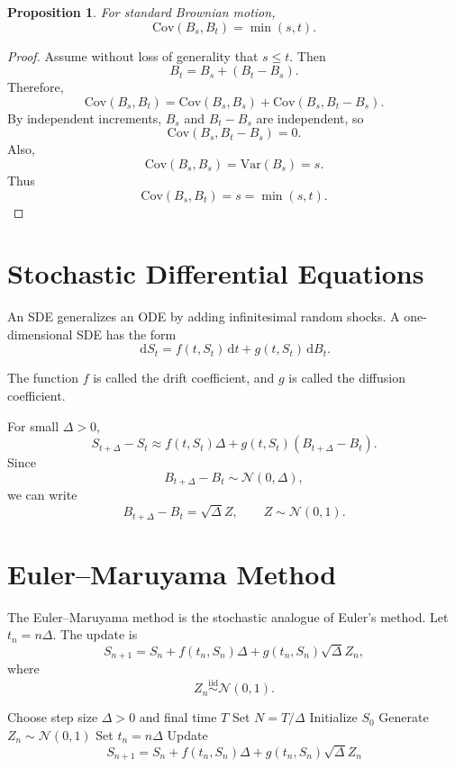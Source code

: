 \documentclass[12pt,oneside]{book}
\numberwithin{equation}{section}
\theoremstyle{definition}
\theoremstyle{plain}
\newtheorem{proposition}{Proposition}[section]
\theoremstyle{remark}
\newcommand{\Var}{\mathrm{Var}}
\newcommand{\Cov}{\mathrm{Cov}}
\newcommand{\iid}{\overset{\text{iid}}{\sim}}
\newcommand{\dd}{\,\mathrm{d}}
\newcommand{\Normal}{\mathcal{N}}
\begin{document}
\begin{proposition}
For standard Brownian motion,
\[
\Cov(B_s,B_t)=\min(s,t).
\]
\end{proposition}

\begin{proof}
Assume without loss of generality that $s\le t$. Then
\[
B_t=B_s+(B_t-B_s).
\]
Therefore,
\[
\Cov(B_s,B_t)
=
\Cov(B_s,B_s)+\Cov(B_s,B_t-B_s).
\]
By independent increments, $B_s$ and $B_t-B_s$ are independent, so
\[
\Cov(B_s,B_t-B_s)=0.
\]
Also,
\[
\Cov(B_s,B_s)=\Var(B_s)=s.
\]
Thus
\[
\Cov(B_s,B_t)=s=\min(s,t).
\]
\end{proof}

\section{Stochastic Differential Equations}

An SDE generalizes an ODE by adding infinitesimal random shocks. A one-dimensional SDE has the form
\[
\dd S_t=f(t,S_t)\dd t+g(t,S_t)\dd B_t.
\]

The function $f$ is called the drift coefficient, and $g$ is called the diffusion coefficient.

For small $\Delta>0$,
\[
S_{t+\Delta}-S_t
\approx
f(t,S_t)\Delta
+
g(t,S_t)(B_{t+\Delta}-B_t).
\]
Since
\[
B_{t+\Delta}-B_t\sim \Normal(0,\Delta),
\]
we can write
\[
B_{t+\Delta}-B_t=\sqrt{\Delta}Z,
\qquad
Z\sim \Normal(0,1).
\]

\section{Euler--Maruyama Method}

The Euler--Maruyama method is the stochastic analogue of Euler's method. Let $t_n=n\Delta$. The update is
\[
S_{n+1}
=
S_n
+
f(t_n,S_n)\Delta
+
g(t_n,S_n)\sqrt{\Delta}Z_n,
\]
where
\[
Z_n\iid \Normal(0,1).
\]

\begin{algorithm}[H]
\caption{Euler--Maruyama Method}
\begin{algorithmic}[1]
\State Choose step size $\Delta>0$ and final time $T$
\State Set $N=T/\Delta$
\State Initialize $S_0$
    \State Generate $Z_n\sim \Normal(0,1)$
    \State Set $t_n=n\Delta$
    \State Update
    \[
    S_{n+1}=S_n+f(t_n,S_n)\Delta+g(t_n,S_n)\sqrt{\Delta}Z_n
    \]
\EndFor
\end{algorithmic}
\end{algorithm}
\end{document}
